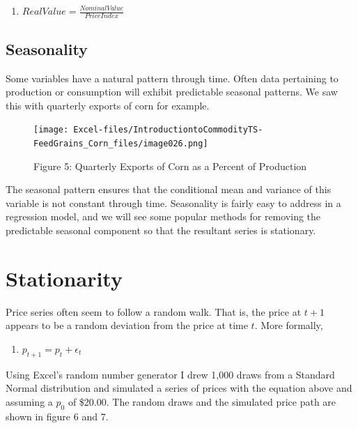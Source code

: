 \documentclass[
  letterpaper,
  DIV=11,
  numbers=noendperiod]{scrreprt}
\providecommand{\tightlist}{%
  \setlength{\itemsep}{0pt}\setlength{\parskip}{0pt}}\usepackage{longtable,booktabs,array}
\begin{document}
\begin{enumerate}
\def\labelenumi{(\arabic{enumi})}
\setcounter{enumi}{1}
\tightlist
\item
  \(Real Value = \frac{Nominal Value}{Price Index}\)
\end{enumerate}

\subsection{Seasonality}\label{seasonality}

Some variables have a natural pattern through time. Often data
pertaining to production or consumption will exhibit predictable
seasonal patterns. We saw this with quarterly exports of corn for
example.

\begin{figure}[H]

{\centering \texttt{[image: Excel-files/IntroductiontoCommodityTS-FeedGrains\_Corn\_files/image026.png]}

}

\caption{Figure 5: Quarterly Exports of Corn as a Percent of Production}

\end{figure}%

The seasonal pattern ensures that the conditional mean and variance of
this variable is not constant through time. Seasonality is fairly easy
to address in a regression model, and we will see some popular methods
for removing the predictable seasonal component so that the resultant
series is stationary.

\section{Stationarity}\label{stationarity}

Price series often seem to follow a random walk. That is, the price at
\(t+1\) appears to be a random deviation from the price at time \(t\).
More formally,

\begin{enumerate}
\def\labelenumi{(\arabic{enumi})}
\setcounter{enumi}{2}
\tightlist
\item
  \(p_{t+1} = p_{t} + \epsilon_t\)
\end{enumerate}

Using Excel's random number generator I drew 1,000 draws from a Standard
Normal distribution and simulated a series of prices with the equation
above and assuming a \(p_0\) of \$20.00. The random draws and the
simulated price path are shown in figure 6 and 7.
\end{document}
